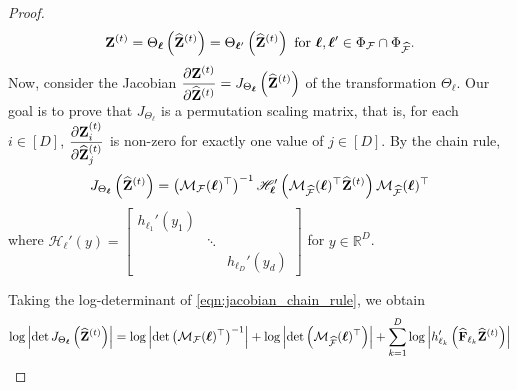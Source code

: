 \begin{proof}
    \begin{equation}
        \mathbf{Z}^{(t)} = \Theta_{\mathbf{\boldsymbol \ell}}\left( \widehat{\mathbf{Z}}^{(t)} \right) = \Theta_{\mathbf{\boldsymbol \ell}'} \left( \widehat{\mathbf{Z}}^{(t)} \right) \text{ for } \mathbf{\boldsymbol \ell}, \mathbf{\boldsymbol \ell}' \in \displaystyle \Phi_\mathcal{F} \cap \Phi_{\widehat{\mathcal{F}}}. \label{eqn:equality_of_maps}
    \end{equation}
     Now, consider the Jacobian $\displaystyle \frac{\partial \mathbf{Z}^{(t)}}{\partial \widehat{\mathbf{Z}}^{(t)}} = J_{\Theta_\mathbf{\boldsymbol \ell}} \left( \widehat{\mathbf{Z}}^{(t)} \right)$ of the transformation $\Theta_\mathbf{\boldsymbol \ell}$. Our goal is to prove that $J_{\Theta_\ell}$ is a permutation scaling matrix, that is, for each $i \in [D]$, $\displaystyle \frac{\partial \mathbf{Z}^{(t)}_i}{\partial \widehat{\mathbf{Z}}^{(t)}_j}$ is non-zero for exactly one value of $j \in [D]$. By the chain rule,
    \begin{align}
        J_{\Theta_\mathbf{\boldsymbol \ell}}\left(\widehat{\mathbf{Z}}^{(t)}\right) = \left(\mathcal{M}_{\mathcal{F}}(\mathbf{\boldsymbol \ell})^{\top}\right)^{-1}\mathscr{H}_{\mathbf{\boldsymbol \ell}}' \left( \mathcal{M}_{\widehat{\mathcal{F}}}(\mathbf{\boldsymbol \ell})^\top \widehat{\mathbf{Z}}^{(t)} \right) \mathcal{M}_{\widehat{\mathcal{F}}}(\mathbf{\boldsymbol \ell})^\top \label{eqn:jacobian_chain_rule}
    \end{align}
    where $\displaystyle \mathscr{H}_{\mathbf{\boldsymbol \ell}}' \left( y \right) =   \begin{bmatrix}
    h_{\ell_1}'(y_1) & & \\
    & \ddots & \\
    & & h_{\ell_D}'(y_d)
  \end{bmatrix}$ for $y \in \mathbb{R}^D$. 
  
  Taking the log-determinant of \eqref{eqn:jacobian_chain_rule}, we obtain
  \begin{align}
      \log \left| \det J_{\Theta_\mathbf{\boldsymbol \ell}} \left( \widehat{\mathbf{Z}}^{(t)} \right) \right| = \log \left| \det \left(\mathcal{M}_{\mathcal{F}}(\mathbf{\boldsymbol \ell})^\top\right)^{-1} \right| + \log \left| \det \left(\mathcal{M}_{\widehat{\mathcal{F}}}(\mathbf{\boldsymbol \ell})^\top\right) \right| + \sum_{k=1}^D \log \left| h'_{{{\ell}_k}} \left( \widehat{\mathbf{F}}_{{{\ell}_k}}\widehat{\mathbf{Z}}^{(t)}\right) \right| \label{eqn:logdet}
  \end{align}
  


\end{proof}
